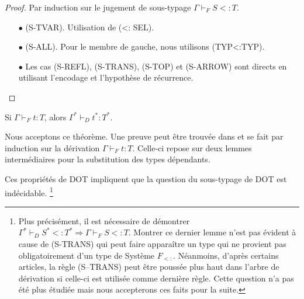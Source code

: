 \begin{proof}
  Par induction sur le jugement de sous-typage $\Gamma \vdash_{F} S <: T$.
  \begin{itemize}
  \item[$\bullet$] (S-TVAR). Utilisation de (<: SEL).
  \item[$\bullet$] (S-ALL). Pour le membre de gauche, nous utilisons (TYP<:TYP).
  \item[$\bullet$] Les cas (S-REFL), (S-TRANS), (S-TOP) et (S-ARROW) sont directs
    en utilisant l'encodage et l'hypothèse de récurrence.
  \end{itemize}
\end{proof}

\begin{theorem}
  Si $\Gamma \vdash_{F} t : T$, alors $\Gamma^{*} \vdash_{D} t^{*} : T^{*}$.
\end{theorem}

Nous acceptons ce théorème. Une preuve peut être trouvée dans
\cite{WF-DOT-2016} et se fait par induction sur la dérivation $\Gamma \vdash_{F}
t : T$. Celle-ci repose sur deux lemmes intermédiaires pour la
substitution des types dépendants.

Ces propriétés de DOT impliquent que la question du sous-typage de DOT est
indécidable\cite{WF-DOT-2016, nada-amin-thesis}.
\footnote{Plus précisément, il est nécessaire de démontrer
$\Gamma^{*} \vdash_{D} S^{*} <: T^{*} \Rightarrow \Gamma \vdash_{F} S <: T$.
Montrer ce dernier lemme n'est pas évident à cause de (S-TRANS) qui
peut faire apparaître un type qui ne provient pas obligatoirement d'un type de
Système $F_{<:}$. Néanmoins, d'après certains articles\cite{OOPSLA-DOT-2016, nada-amin-thesis}, la règle (S--TRANS) peut être
poussée plus haut dans l'arbre de dérivation si celle-ci est utilisée comme
dernière règle. Cette question n'a pas été plus étudiée mais nous
accepterons ces faits pour la suite.}

